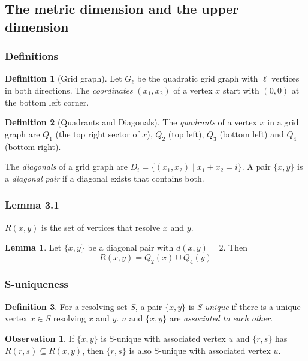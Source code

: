 \documentclass[hyperref={pdfpagelabels=false}]{beamer}
\theoremstyle{definition}
\newtheorem{dfn}{Definition}
\newtheorem{obs}{Observation}
\theoremstyle{theorem}
\newtheorem{lem}{Lemma}
\begin{document}
\subsection{The metric dimension and the upper dimension}
\begin{frame}
	\frametitle{Definitions}
	\begin{dfn}[Grid graph]
		Let $G_\ell$ be the quadratic grid graph with $\ell$ vertices in both directions. The \emph{coordinates} $(x_1,x_2)$ of a vertex $x$ start with $(0,0)$ at the bottom left corner.
	\end{dfn}
	\begin{dfn}[Quadrants and Diagonals]
		The \emph{quadrants} of a vertex $x$ in a grid graph are $Q_1$ (the top right sector of $x$), $Q_2$ (top left), $Q_3$ (bottom left) and $Q_4$ (bottom right).

		The \emph{diagonals} of a grid graph are $D_i = \{ (x_1,x_2) \mid x_1 + x_2 = i \}$. A pair $\{x,y\}$ is a \emph{diagonal pair} if a diagonal exists that contains both.
	\end{dfn}
\end{frame}
\begin{frame}
	\frametitle{Lemma 3.1}
	$R(x,y)$ is the set of vertices that resolve $x$ and $y$.
	\begin{lem}
		Let $\{x,y\}$ be a diagonal pair with $d(x,y) = 2$. Then
		\[ R(x,y) = Q_2(x) \cup Q_4(y) \]
	\end{lem}
\end{frame}
\begin{frame}
	\frametitle{S-uniqueness}
	\begin{dfn}
		For a resolving set $S$, a pair $\{x,y\}$ is \emph{S-unique} if there is a unique vertex $x \in S$ resolving $x$ and $y$. $u$ and $\{x,y\}$ are \emph{associated to each other}.
	\end{dfn}
	\begin{obs}
		If $\{x,y\}$ is S-unique with associated vertex $u$ and $\{r,s\}$ has $R(r,s) \subseteq R(x,y)$, then $\{r,s\}$ is also S-unique with associated vertex $u$.
	\end{obs}
\end{frame}
\end{document}
